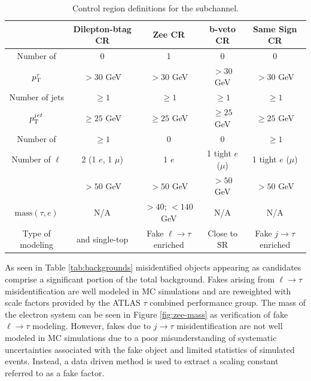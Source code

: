 		\begin{table}[!thp]
			\begin{tabular}{| c | c | c | c | c |} \hline
																& Dilepton-btag CR 				& Zee CR 												& b-veto CR 					& Same Sign CR 						 							\\ \hline
				Number of \tauhad 			& 0 											& 1 														& 0 									& 0 																		\\ \hline
				$p_{\text{T}}^{\tau}$ 						& $ > 30$ GeV 						& $ > 30$ GeV 									& $ > 30$ GeV 				& $ > 30$ GeV 													\\ \hline
				Number of jets 					& $\geq 1$ 								& $\geq 1$ 											& $\geq 1$ 						& $\geq 1$ 															\\ \hline
				$p_{\text{T}}^{jet}$ 						& $\geq 25$ GeV 					& $\geq 25$ GeV 								& $\geq 25$ GeV 			& $\geq 25$ GeV 												\\ \hline
				Number of \bjets				& $\geq 1$ 								& 0 														& 0 									& $\geq 1$ 															\\ \hline
				Number of $\ell$ 				& 2 (1 $e$, 1 $\mu$)			& 1 $e$													& 1 tight $e$ ($\mu$)	& 1 tight $e$ ($\mu$)										\\ \hline
				\Etm 										& $> 50$ GeV 							& $> 50$ GeV 										& $> 50$ GeV 					& $> 50$ GeV 														\\ \hline
				$\mathrm{mass}(\tau,e)$	& N/A 										& $> 40$; $< 140$ GeV 					& N/A 								& N/A 																	\\ \hline
				Type of modeling 				& \ttbar and single-top 	& Fake $\ell \to \tau$ enriched	& Close to SR 				& Fake $j \to \tau$ enriched 						\\ \hline
			\end{tabular}
			\caption{Control region definitions for the \taulep subchannel.}
			\label{tab:taulep-control-regions}
		\end{table}



		As seen in Table \ref{tab:backgrounds} misidentified objects appearing as \tauhad candidates comprise a significant portion of the total background. Fakes arising from $\ell \to \tau$ misidentification are well modeled in \gls{MC} simulations and are reweighted with scale factors provided by the ATLAS $\tau$ combined performance group. The mass of the \tauhad electron system can be seen in Figure \ref{fig:zee-mass} as verification of fake $\ell \to \tau$ modeling. However, fakes due to $j \to \tau$ misidentification are not well modeled in \gls{MC} simulations due to a poor misunderstanding of systematic uncertainties associated with the fake \tauhad object and limited statistics of simulated events. Instead, a data driven method is used to extract a scaling constant referred to as a fake factor.

